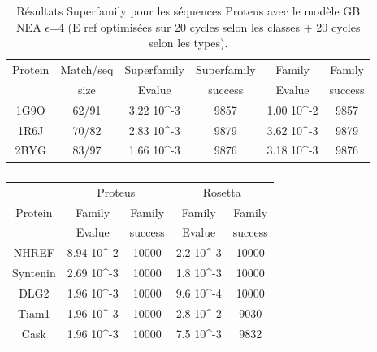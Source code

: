 \begin{table}[h]
  \raggedleft{}
  
  \begin{tabular}{cccccc}
    
    \toprule
    Protein & Match/seq & Superfamily & Superfamily & Family & Family \\
            & size      & Evalue      & success     & Evalue & success\\
    \cmidrule{1-6}
    1G9O  & 62/91 & 3.22 10^{-3}  & 9857  & 1.00 10^{-2} & 9857 \\
    1R6J  & 70/82 & 2.83 10^{-3}  & 9879  & 3.62 10^{-3} & 9879 \\
    2BYG  & 83/97 & 1.66 10^{-3}  & 9876  & 3.18 10^{-3} & 9876 \\

    \bottomrule        
  \end{tabular}   
  \caption{Résultats Superfamily pour les séquences Proteus avec le modèle GB NEA $\epsilon$=4 (E ref optimisées sur 20 cycles selon les classes + 20 cycles selon les types).}   
  \label{tab:superfamily_model_B6}       
\end{table}


   \clearpage
\begin{table}[h]
  \raggedleft{}

  \begin{tabular}{ccc|cc}
    
    \toprule
               & \multicolumn{2}{c|}{Proteus} & \multicolumn{2}{c}{Rosetta} \\
    \cmidrule{1-5}
    Protein    & Family & Family  & Family & Family \\
               & Evalue & success & Evalue & success \\
    \cmidrule{1-5}
    NHREF         & 8.94 10^{-2} & 10000  & 2.2  10^{-3} & 10000 \\
    Syntenin      & 2.69 10^{-3} & 10000  & 1.8  10^{-3} & 10000 \\
    DLG2          & 1.96 10^{-3} & 10000  & 9.6  10^{-4} & 10000 \\
    Tiam1         & 1.96 10^{-3} & 10000  & 2.8  10^{-2} &  9030 \\
    Cask          & 1.96 10^{-3} & 10000  & 7.5  10^{-3} &  9832 \\

    \bottomrule        
  \end{tabular}   
  \caption{}   
  \label{AMMIB}       
\end{table}


